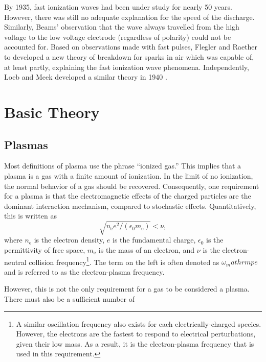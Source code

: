 By 1935, fast ionization waves had been under study for nearly 50 years.
However, there was still no adequate explanation for the speed of the discharge.
Similarly, Beams' observation that the wave always travelled from the high
voltage to the low voltage electrode (regardless of polarity) could not be
accounted for. Based on observations made with fast pulses, Flegler and Raether
to developed a new theory of breakdown for sparks in air \cite{Flegler1936}
which was capable of, at least partly, explaining the fast ionization wave
phenomena. Independently, Loeb and Meek developed a similar theory in 1940
\cite{Loeb1940}.

\section{Basic Theory}

\subsection{Plasmas}

Most definitions of plasma use the phrase ``ionized gas.'' This implies that a
plasma is a gas with a finite amount of ionization. In the limit of no
ionization, the normal behavior of a gas should be recovered. Consequently, one
requirement for a plasma is that the electromagnetic effects of the charged
particles are the dominant interaction mechanism, compared to stochastic
effects. Quantitatively, this is written as
\begin{equation}
  \sqrt{n_\mathrm{e} e^2 / (\epsilon_0 m_\mathrm{e})} < \nu,
\end{equation}
where $n_\mathrm{e}$ is the electron density, $e$ is the fundamental charge,
$\epsilon_0$ is the permittivity of free space, $m_\mathrm{e}$ is the mass of an
electron, and $\nu$ is the electron-neutral collision frequency\footnote{A
similar oscillation frequency also exists for each electrically-charged species.
However, the electrons are the fastest to respond to electrical perturbations,
given their low mass. As a result, it is the electron-plasma frequency that is
used in this requirement.}. The term on the left is often denoted as
$\omega_mathrm{pe}$ and is referred to as the electron-plasma frequency.

However, this is not the only requirement for a gas to be considered a plasma.
There must also be a sufficient number of



